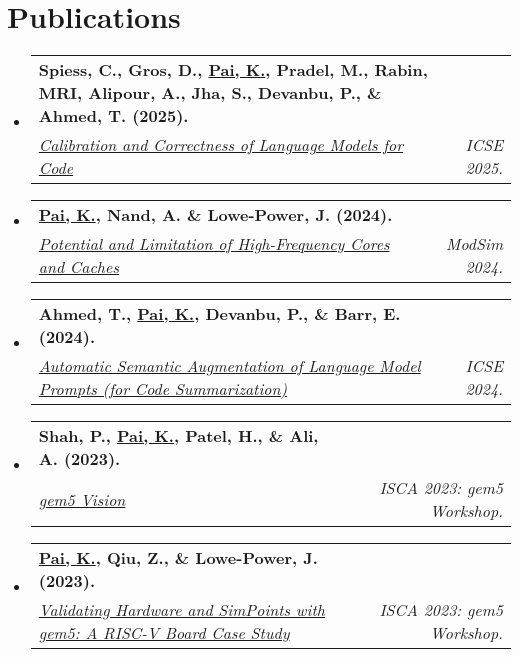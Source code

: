 \documentclass[letterpaper,10pt]{article}
\makeatletter
\newcommand{\resumeSubheading}[4]{
\vspace{-1pt}\item
  \begin{tabular*}{0.97\textwidth}[t]{l@{\extracolsep{\fill}}r}
    \textbf{#1} & #2 \\
    \textit{#3} & \textit{#4} \\
  \end{tabular*}\vspace{-7pt}
}
\newcommand{\resumeSubHeadingList}{\begin{itemize}[leftmargin=0.15in, label={}]}
\newcommand{\resumeSubHeadingListEnd}{\end{itemize}}
\makeatother
\begin{document}
\section{Publications}
\resumeSubHeadingList
  \resumeSubheading
      {Spiess, C., Gros, D., \underline{Pai, K.}, Pradel, M., Rabin, MRI, Alipour, A., Jha, S., Devanbu, P., \& Ahmed, T. (2025).}{}
      {\href{https://arxiv.org/pdf/2402.02047}{Calibration and Correctness of Language Models for Code}}{ICSE 2025.}
  \resumeSubheading
      {\underline{Pai, K.}, Nand, A. \& Lowe-Power, J. (2024).}{}
      {\href{https://arch.cs.ucdavis.edu/simulation/2024/08/06/potentiallimitationhighfreqcorescaches.html}{Potential and Limitation of High-Frequency Cores and Caches}}{ModSim 2024.}
  \resumeSubheading
      {Ahmed, T., \underline{Pai, K.}, Devanbu, P., \& Barr, E. (2024).}{}
      {\href{https://dl.acm.org/doi/pdf/10.1145/3597503.3639183}{Automatic Semantic Augmentation of Language Model Prompts (for Code Summarization)}}{ICSE 2024.}
  \resumeSubheading
      {Shah, P., \underline{Pai, K.}, Patel, H., \& Ali, A. (2023).}{}
      {\href{https://www.gem5.org/assets/files/workshop-isca-2023/posters/gem5-vision-poster.pdf}{gem5 Vision}}{ISCA 2023: gem5 Workshop.}
  \resumeSubheading
      {\underline{Pai, K.}, Qiu, Z., \& Lowe-Power, J. (2023).}{}
      {\href{https://www.gem5.org/assets/files/workshop-isca-2023/posters/validating-hardware-and-simpoints-with-gem5-poster.pdf}{Validating Hardware and SimPoints with gem5: A RISC-V Board Case Study}}{ISCA 2023: gem5 Workshop.}
\resumeSubHeadingListEnd
\end{document}

